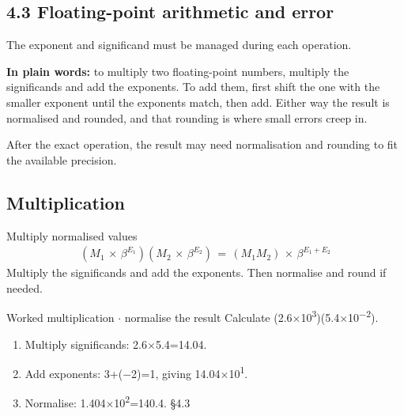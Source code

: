 \documentclass[11pt]{article}
\begin{document}
\begin{keepsection}
\section{4.3 Floating-point arithmetic and error}

The exponent and significand must be managed during each operation.

\begin{plainbox}\textbf{In plain words:} to multiply two floating-point numbers, multiply the significands and add the exponents. To add them, first shift the one with the smaller exponent until the exponents match, then add. Either way the result is normalised and rounded, and that rounding is where small errors creep in.\end{plainbox}

After the exact operation, the result may need normalisation and rounding to fit the available precision.

\begin{keepsection}
\subsection{Multiplication}

\begin{equationcard}{Multiply normalised values}
\[ \begin{gathered} ({M}_{1}\, \times \, β^{{E}_{1}})({M}_{2}\, \times \, β^{{E}_{2}})\, =\, ({M}_{1}{M}_{2})\, \times \, β^{{E}_{1}+{E}_{2}} \end{gathered} \]
{\small Multiply the significands and add the exponents. Then normalise and round if needed.}
\end{equationcard}

\begin{workedbox}{Worked multiplication \ensuremath{\cdot} normalise the result}
Calculate (2.6\ensuremath{\times}10\textsuperscript{3})(5.4\ensuremath{\times}10\textsuperscript{\ensuremath{-}2}).

\begin{enumerate}
\item Multiply significands: 2.6\ensuremath{\times}5.4=14.04.
\item Add exponents: 3+(\ensuremath{-}2)=1, giving 14.04\ensuremath{\times}10\textsuperscript{1}.
\item Normalise: 1.404\ensuremath{\times}10\textsuperscript{2}=140.4. \hfill{\small\color{FAUblue}§4.3}
\end{enumerate}
\end{workedbox}
\end{keepsection}


\end{keepsection}
\end{document}
